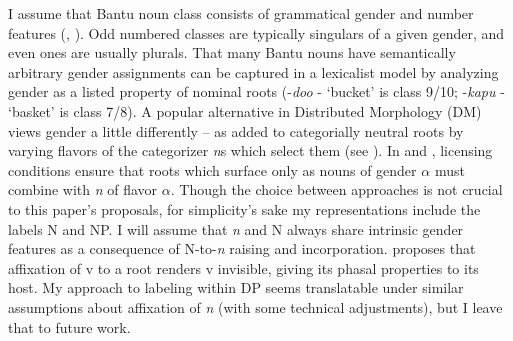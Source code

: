 \documentclass[output=paper
,modfonts
,nonflat]{langsci/langscibook}
\begin{document}
I assume that Bantu noun class consists of grammatical gender and number features (\citealt{Corbett1991}, \citealt{Carstens1991}). Odd numbered classes are typically singulars of a given gender, and even ones are usually plurals. That many Bantu nouns have semantically arbitrary gender assignments can be captured in a lexicalist model by analyzing gender as a listed property of nominal roots (-\textit{doo} - `bucket' is class 9/10; -\textit{kapu} - `basket' is class 7/8). A popular alternative in Distributed Morphology (DM) views gender a little differently -- as added to categorially neutral roots by varying flavors of the categorizer \textit{n}s which select them (see \citealt{Lecarme2002,Ferrari2005,Kihm2005,Acquaviva2009,Kramer2015}). In \citet{Acquaviva2009} and \citet{Kramer2015}, licensing conditions ensure that roots which surface only as nouns of gender $\alpha$ must combine with \textit{n} of flavor $\alpha$.  
Though the choice between approaches is not crucial to this paper's proposals, for simplicity's sake my representations include the labels N and NP. I will assume that \textit{n} and N always share intrinsic gender features as a consequence of N-to-\textit{n} raising and incorporation. \citet{Chomsky2015} proposes that affixation of v to a root renders v invisible, giving its phasal properties to its host. My approach to labeling within DP seems translatable under similar assumptions about affixation of \textit{n} (with some technical adjustments), but I leave that to future work. 
\end{document}
